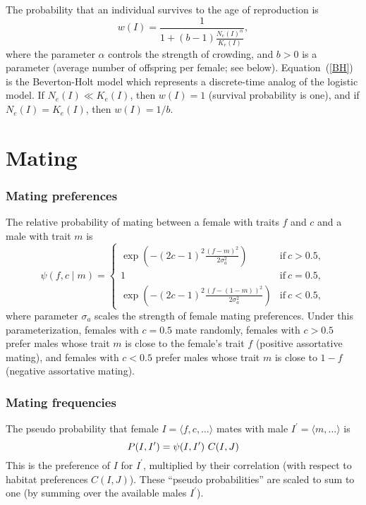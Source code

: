 \documentclass{article}
\begin{document}
The probability that an individual survives to the age of reproduction is
	\begin{equation} \label{BH}
		w(I)=\frac{1}{1+(b-1)\frac{N_e(I)^\alpha}{K_e(I)}},
	\end{equation}
where the parameter $\alpha$ controls the strength of
crowding, and $b>0$ is a parameter (average number of offspring per female;
see below).  Equation~(\ref{BH}) is the Beverton-Holt model which
represents a discrete-time analog of the logistic model. If $N_e(I)\ll
K_e(I)$, then $w(I)=1$ (survival probability is one), and if
$N_e(I)=K_e(I)$, then $w(I)=1/b$.

\section{Mating}

\subsubsection{Mating preferences}

The relative probability of mating between a
female with traits $f$ and $c$ and a male with trait $m$ is
	\begin{equation}  \label{pref}
	\psi(f,c\mid m) =  \left\{ \begin{array}{ll}
                         \exp \left( -(2c-1)^2 \frac{(f-m)^2}{2\sigma_a^2}\right) & \mbox{if}\ c > 0.5, \\
			  1 & \mbox{if}\ c=0.5,\\
                         \exp \left( -(2c-1)^2 \frac{(f-(1-m))^2}{2\sigma_a^2}\right) & \mbox{if}\ c<0.5,
                      \end{array} \right.
	\end{equation}
where parameter $\sigma_a$ scales the strength of female mating preferences. Under this parameterization,
females with $c=0.5$ mate randomly, females with $c>0.5$ prefer males whose trait $m$ is close to 
the female's trait $f$ (positive assortative mating), and females with $c<0.5$ prefer males whose 
trait $m$ is close to $1-f$ (negative assortative mating). 


\subsubsection{Mating frequencies}

The pseudo probability that female
$I = \langle f,c,\ldots \rangle$ mates with male $I^{\prime}= \langle m,\ldots \rangle$ is
\begin{equation}
P(I,I^{\prime}) = \psi(I,I^{\prime})\ C(I,J) \\
\end{equation}
This is the preference of $I$ for $I^{\prime}$, multiplied by their
correlation (with respect to habitat preferences $C(I,J)$).  These ``pseudo
probabilities'' are scaled to sum to one (by summing over the available males $I^\prime$).
\end{document}
